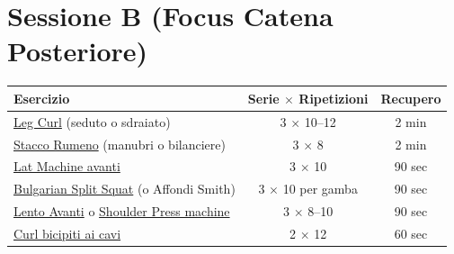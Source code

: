 \documentclass[11pt,a4paper]{article}
\begin{document}
\section*{Sessione B (Focus Catena Posteriore)}
\begin{tabular}{>{\raggedright\arraybackslash}p{6.5cm} c c}
\toprule
\textbf{Esercizio} & \textbf{Serie $\times$ Ripetizioni} & \textbf{Recupero} \\
\midrule
\href{https://www.youtube.com/results?search_query=leg+curl+tutorial+short}{Leg Curl} (seduto o sdraiato) & 3 $\times$ 10--12 & 2 min \\
\href{https://www.youtube.com/results?search_query=romanian+deadlift+tutorial+short}{Stacco Rumeno} (manubri o bilanciere) & 3 $\times$ 8 & 2 min \\
\href{https://www.youtube.com/results?search_query=lat+pulldown+tutorial+short}{Lat Machine avanti} & 3 $\times$ 10 & 90 sec \\
\href{https://www.youtube.com/results?search_query=bulgarian+split+squat+tutorial+short}{Bulgarian Split Squat} (o Affondi Smith) & 3 $\times$ 10 per gamba & 90 sec \\
\href{https://www.youtube.com/results?search_query=seated+dumbbell+overhead+press+tutorial+short}{Lento Avanti} o \href{https://www.youtube.com/results?search_query=machine+shoulder+press+tutorial+short}{Shoulder Press machine} & 3 $\times$ 8--10 & 90 sec \\
\href{https://www.youtube.com/results?search_query=cable+bicep+curl+tutorial+short}{Curl bicipiti ai cavi} & 2 $\times$ 12 & 60 sec \\
\bottomrule
\end{tabular}
\end{document}
